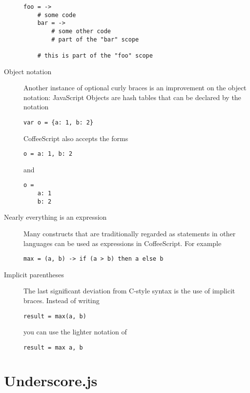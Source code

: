 \begin{description}
\begin{verbatim}
foo = ->
    # some code
    bar = ->
        # some other code
        # part of the "bar" scope

    # this is part of the "foo" scope
\end{verbatim}

\item[Object notation]
Another instance of optional curly braces is an improvement on the object
notation: JavaScript Objects are hash tables that can be declared by the
notation

\begin{verbatim}
var o = {a: 1, b: 2}
\end{verbatim}

CoffeeScript also accepts the forms

\begin{verbatim}
o = a: 1, b: 2
\end{verbatim}

and

\begin{verbatim}
o =
    a: 1
    b: 2
\end{verbatim}


\item[Nearly everything is an expression]
Many constructs that are traditionally regarded as statements in other languages
can be used as expressions in CoffeeScript. For example

\begin{verbatim}
max = (a, b) -> if (a > b) then a else b
\end{verbatim}

\item[Implicit parentheses]
The last significant deviation from C-style syntax is the use of implicit
braces. Instead of writing

\begin{verbatim}
result = max(a, b)
\end{verbatim}

you can use the lighter notation of

\begin{verbatim}
result = max a, b
\end{verbatim}

\end{description}

\section{Underscore.js}


